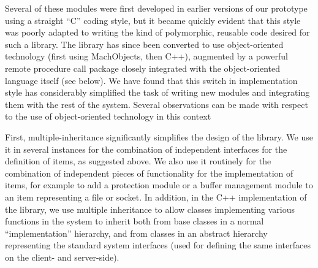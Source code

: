 
Several of these modules were first developed in earlier versions of
our prototype using a straight ``C'' coding style, but it became
quickly evident that this style was poorly adapted to writing the kind
of polymorphic, reusable code desired for such a library. The library
has since been converted to use object-oriented technology (first
using MachObjects\cite{JULIN89}, then C++), augmented by a
powerful remote procedure call package closely integrated with the
object-oriented language itself (see below). We have found that this
switch in implementation style has considerably simplified the task of
writing new modules and integrating them with the rest of the system.
Several observations can be made with respect to the use of
object-oriented technology in this context\cite{GUEDES91}

First, multiple-inheritance significantly simplifies the design of the
library. We use it in several instances for the combination of
independent interfaces for the definition of items, as suggested
above. We also use it routinely for the combination of independent
pieces of functionality for the implementation of items, for example
to add a protection module or a buffer management module to an item
representing a file or socket.  In addition, in the C++ implementation
of the library, we use multiple inheritance to allow classes
implementing various functions in the system to inherit both from base
classes in a normal ``implementation'' hierarchy, and from classes in
an abstract hierarchy representing the standard system interfaces
(used for defining the same interfaces on the client- and
server-side).

